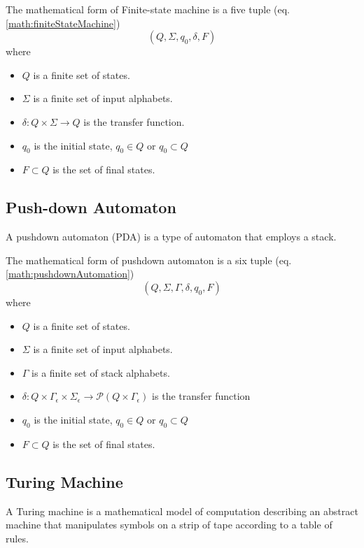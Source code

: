 The mathematical form of Finite-state machine is a five tuple (eq. \ref{math:finiteStateMachine})
\begin{equation}\label{math:finiteStateMachine}
    (Q, \Sigma, q_0, \delta, F)
\end{equation}
where
\begin{itemize}
    \item $Q$ is a finite set of states.
    \item $\Sigma$ is a finite set of input alphabets.
    \item $\delta: Q \times \Sigma \to Q$ is the transfer function.
    \item $q_0$ is the initial state, $q_0\in Q$ or $q_0\subset Q$
    \item $F \subset Q$ is the set of final states.
\end{itemize}

\subsection{Push-down Automaton}
A pushdown automaton (PDA) is a type of automaton that employs a stack.


The mathematical form of pushdown automaton is a six tuple  (eq. \ref{math:pushdownAutomation})
\begin{equation} \label{math:pushdownAutomation}
    (Q, \Sigma, \Gamma, \delta, q_0, F)
\end{equation}
where
\begin{itemize}
    \item $Q$ is a finite set of states.
    \item $\Sigma$ is a finite set of input alphabets.
    \item $\Gamma$ is a finite set of stack alphabets.
    \item $\delta: Q \times \Gamma_\epsilon \times \Sigma_\epsilon \to  \mathcal{P}(Q \times \Gamma_\epsilon)$ is the transfer function
    \item $q_0$ is the initial state, $q_0\in Q$ or $q_0\subset Q$
    \item $F \subset Q$ is the set of final states.
\end{itemize}

\subsection{Turing Machine}
A Turing machine is a mathematical model of computation describing an abstract machine that manipulates symbols on a strip of tape according to a table of rules.

